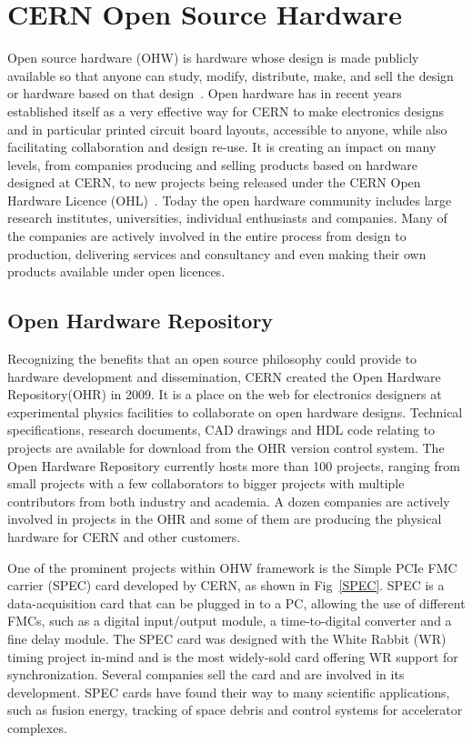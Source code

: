\documentclass[a4paper,
              ]{jacow}
\begin{document}
\section{CERN Open Source Hardware}
Open source hardware (OHW) is hardware whose design is made publicly available so that anyone can study, modify, distribute, make, and sell the design or hardware based on that design~\cite{OHW}. Open hardware has in recent years established itself as a very effective way for CERN to make electronics designs and in particular printed circuit board layouts, accessible to anyone, while also  facilitating collaboration and design re-use. It is creating an impact on  many levels, from companies producing and selling products based on  hardware designed at CERN, to new projects being released under the CERN Open Hardware Licence (OHL)~\cite{OHL}. Today the open hardware community includes large research institutes, universities, individual enthusiasts and companies. Many of the companies are actively involved in the  entire process from design to production, delivering services and consultancy and even making their own products available under open licences.

\subsection{Open Hardware Repository}
Recognizing the benefits that an open source philosophy could provide to hardware development and dissemination, CERN created the Open Hardware Repository(OHR) in 2009. It is a place on the web for electronics designers at experimental physics facilities to collaborate on open hardware designs. Technical specifications, research documents, CAD drawings and HDL code relating to projects are available for download from the OHR version control system. The Open Hardware Repository currently hosts more than 100 projects, ranging from small projects with a few collaborators to bigger projects with multiple contributors from both industry and academia. A dozen companies are actively involved in projects in the OHR and some of them are producing the physical hardware for CERN and other customers.

One of the prominent projects within OHW framework is the Simple PCIe FMC carrier (SPEC) card developed by CERN, as shown in Fig~\ref{SPEC}. SPEC is a data-acquisition card that can be plugged in to a PC, allowing the use of different FMCs, such as a digital input/output module, a time-to-digital converter and a fine delay module. The SPEC card was designed with the White Rabbit (WR) timing project in-mind and is the most widely-sold card offering WR support for synchronization. Several companies sell the card and are involved in its development. SPEC cards have found their way to many scientific applications, such as fusion energy, tracking of space debris and control systems for accelerator complexes.
\end{document}

